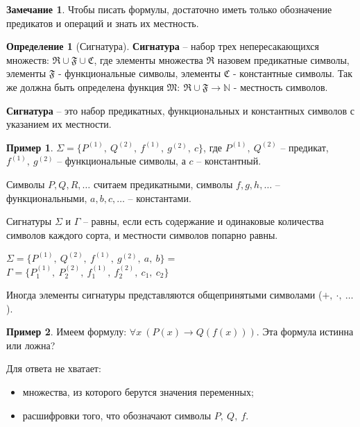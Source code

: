 \documentclass{report}
\theoremstyle{definition}
\newtheorem{definition}{Определение}[section]
\newtheorem{example}{Пример}
\newtheorem*{remark}{Замечание}
\begin{document}
\begin{remark}
    Чтобы писать формулы, достаточно иметь только обозначение предикатов и операций и знать их местность.
\end{remark}

\begin{definition}[Сигнатура]
    \textbf{Сигнатура} -- набор трех непересакающихся множеств: $\mathfrak{R} \cup \mathfrak{F} \cup \mathfrak{C}$, где элементы множества $\mathfrak{R}$ назовем предикатные символы, элементы $\mathfrak{F}$ - функциональные символы, элементы $\mathfrak{C}$ - константные символы. Так же должна быть определена функция $\mathfrak{M}: \ \mathfrak{R} \cup \mathfrak{F} \rightarrow \mathbb{N}$ - местность символов.

    \textbf{Сигнатура} -- это набор предикатных, функциональных и константных символов с указанием их местности.
\end{definition}

\begin{example}
    $\Sigma = \{P^{(1)}, \ Q^{(2)}, \ f^{(1)}, \ g^{(2)}, \ c\}$, где $P^{(1)}, \ Q^{(2)}$ -- предикат, $f^{(1)}, \ g^{(2)}$ -- функциональные символы, а $c$ -- константный.
\end{example}

Символы $P, Q, R, \ldots$ считаем предикатными, символы $f, g, h, \ldots$ -- функциональными, $a, b, c, \ldots$ -- константами.

Сигнатуры $\Sigma$ и $\Gamma$ -- равны, если есть содержание и одинаковые количества символов каждого сорта, и местности символов попарно равны.
\begin{center}
    $\Sigma = \{P^{(1)}, \ Q^{(2)}, \ f^{(1)}, \ g^{(2)}, \ a, \ b\} =$ \\

    $\Gamma = \{P_1^{(1)}, \ P_2^{(2)}, \ f_1^{(1)}, \ f_2^{(2)}, \ c_1, \ c_2\}$
\end{center}

Иногда элементы сигнатуры представляются общепринятыми символами ($+, \ \cdot, \ \ldots$).

\begin{example}
    Имеем формулу: $\forall x \ (P(x) \rightarrow Q(f(x)))$. Эта формула истинна или ложна?

    Для ответа не хватает:
    \begin{itemize}
        \item множества, из которого берутся значения переменных;
        \item расшифровки того, что обозначают символы $P, \ Q, \ f$.
    \end{itemize}
\end{example}
\end{document}

